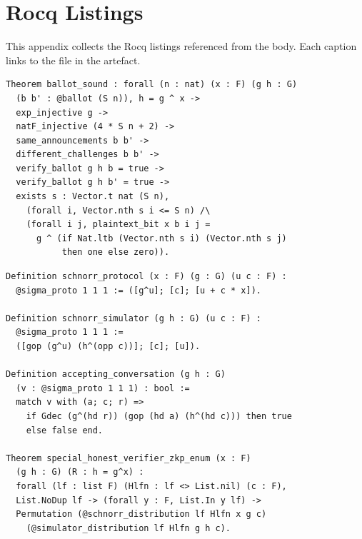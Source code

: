 \section{Rocq Listings}\label{appendix_listings}
This appendix collects the Rocq listings referenced from the body. 
Each caption links to the file in the artefact. 
\begin{lstlisting}[frame=single, language=Coq, caption={Ballot soundness ({\rocq[\texttt{Frontend/Schulze.v}]{ballot_sound}})},
  label={lst:ballot-sound},captionpos=t, basicstyle=\ttfamily\scriptsize,
  abovecaptionskip=-\medskipamount]
Theorem ballot_sound : forall (n : nat) (x : F) (g h : G)
  (b b' : @ballot (S n)), h = g ^ x -> 
  exp_injective g -> 
  natF_injective (4 * S n + 2) -> 
  same_announcements b b' -> 
  different_challenges b b' ->
  verify_ballot g h b = true -> 
  verify_ballot g h b' = true ->
  exists s : Vector.t nat (S n),
    (forall i, Vector.nth s i <= S n) /\
    (forall i j, plaintext_bit x b i j =
      g ^ (if Nat.ltb (Vector.nth s i) (Vector.nth s j)
           then one else zero)).
\end{lstlisting}
\begin{lstlisting}[frame=single, language=Coq, caption={The Schnorr protocol and its zero-knowledge theorem ({\rocq[\texttt{Crypto/Sigma.v}]{schnorr_protocol}})},
  label={schn_nat},captionpos=t, basicstyle=\ttfamily\scriptsize,
  abovecaptionskip=-\medskipamount]
Definition schnorr_protocol (x : F) (g : G) (u c : F) :
  @sigma_proto 1 1 1 := ([g^u]; [c]; [u + c * x]).

Definition schnorr_simulator (g h : G) (u c : F) :
  @sigma_proto 1 1 1 := 
  ([gop (g^u) (h^(opp c))]; [c]; [u]).

Definition accepting_conversation (g h : G)
  (v : @sigma_proto 1 1 1) : bool :=
  match v with (a; c; r) =>
    if Gdec (g^(hd r)) (gop (hd a) (h^(hd c))) then true
    else false end.
    
Theorem special_honest_verifier_zkp_enum (x : F) 
  (g h : G) (R : h = g^x) :
  forall (lf : list F) (Hlfn : lf <> List.nil) (c : F),
  List.NoDup lf -> (forall y : F, List.In y lf) ->
  Permutation (@schnorr_distribution lf Hlfn x g c)
    (@simulator_distribution lf Hlfn g h c).
\end{lstlisting}

